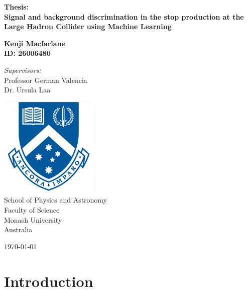 \documentclass[12pt]{article}
\begin{document}
\begin{titlepage}
		\begin{center}
			\vspace*{2cm}
			\LARGE
			\textbf{Thesis: \\
Signal and background discrimination in the stop production at the Large Hadron Collider using Machine Learning}
			
			\vspace{2cm}
			\textbf{Kenji Macfarlane \\ ID: 26006480}
			
			\vspace{0.8cm}
			\Large
			\textit{Supervisors:}\\
			Professor German Valencia \\
			Dr. Ursula Laa
			
			\vfill
			
			\vspace{0.3cm}
			\includegraphics[width=0.2\linewidth]{monashlogo.png}\\
			School of Physics and Astronomy\\
			Faculty of Science\\
			Monash University\\
			Australia
			
			\vspace{0.5cm}
			
			\today
			
	\end{center}
\end{titlepage}



\begin{abstract}
\noindent 
\end{abstract}

\setcounter{page}{1}
\tableofcontents
\clearpage


\setcounter{page}{1}
\section{Introduction}




\end{document}
